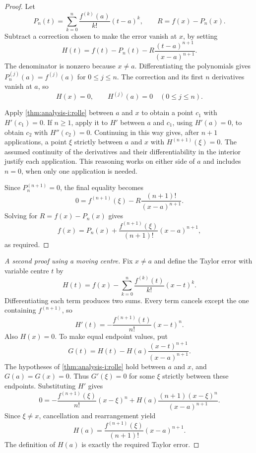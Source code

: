\begin{proof}
  Let
  \[
    P_n(t)=\sum_{k=0}^{n}\frac{f^{(k)}(a)}{k!}(t-a)^k,
    \qquad R=f(x)-P_n(x).
  \]
  Subtract a correction chosen to make the error vanish at $x$, by setting
  \[
    H(t)=f(t)-P_n(t)-R\frac{(t-a)^{n+1}}{(x-a)^{n+1}}.
  \]
  The denominator is nonzero because $x\ne a$. Differentiating the
  polynomials gives $P_n^{(j)}(a)=f^{(j)}(a)$ for $0\le j\le n$.
  The correction and its first $n$ derivatives vanish at $a$, so
  \[
    H(x)=0,\qquad H^{(j)}(a)=0\quad(0\le j\le n).
  \]

  Apply \autoref{thm:analysis-i:rolle} between $a$ and $x$ to obtain
  a point $c_1$ with $H'(c_1)=0$. If $n\ge1$, apply it to $H'$
  between $a$ and $c_1$, using $H'(a)=0$, to obtain $c_2$ with
  $H''(c_2)=0$. Continuing in this way gives, after $n+1$ applications,
  a point $\xi$ strictly between $a$ and $x$ with $H^{(n+1)}(\xi)=0$.
  The assumed continuity of the derivatives and their differentiability
  in the interior justify each application. This reasoning works on
  either side of $a$ and includes $n=0$, when only one application is needed.

  Since $P_n^{(n+1)}=0$, the final equality becomes
  \[
    0=f^{(n+1)}(\xi)-R\frac{(n+1)!}{(x-a)^{n+1}}.
  \]
  Solving for $R=f(x)-P_n(x)$ gives
  \[
    f(x)=P_n(x)+\frac{f^{(n+1)}(\xi)}{(n+1)!}(x-a)^{n+1},
  \]
  as required.
\end{proof}



\begin{proof}[A second proof using a moving centre]
  Fix $x\ne a$ and define the Taylor error with variable centre $t$ by
  \[
    H(t)=f(x)-\sum_{k=0}^n\frac{f^{(k)}(t)}{k!}(x-t)^k.
  \]
  Differentiating each term produces two sums. Every term cancels
  except the one containing $f^{(n+1)}$, so
  \[
    H'(t)=-\frac{f^{(n+1)}(t)}{n!}(x-t)^n.
  \]
  Also $H(x)=0$. To make equal endpoint values, put
  \[
    G(t)=H(t)-H(a)\frac{(x-t)^{n+1}}{(x-a)^{n+1}}.
  \]
  The hypotheses of \autoref{thm:analysis-i:rolle} hold between $a$
  and $x$, and $G(a)=G(x)=0$. Thus $G'(\xi)=0$ for some $\xi$
  strictly between these endpoints. Substituting $H'$ gives
  \[
    0=-\frac{f^{(n+1)}(\xi)}{n!}(x-\xi)^n
      +H(a)\frac{(n+1)(x-\xi)^n}{(x-a)^{n+1}}.
  \]
  Since $\xi\ne x$, cancellation and rearrangement yield
  \[
    H(a)=\frac{f^{(n+1)}(\xi)}{(n+1)!}(x-a)^{n+1}.
  \]
  The definition of $H(a)$ is exactly the required Taylor error.
\end{proof}

